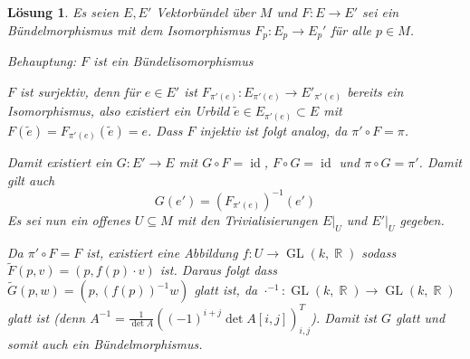 \documentclass[paper=A4, twoside, chapterprefix=true, bibliography=totoc, headsepline]{scrbook}
\DeclareMathOperator{\R}{\mathbb{R}}
\DeclareMathOperator{\GL}{GL}       %
\DeclareMathOperator{\Id}{id}       %
\newcommand{\X}{\times}
\theoremstyle{plain}
\theoremstyle{nonumberplain}
\theoremstyle{empty}
\theoremstyle{break}
\newtheorem{Loes}{L\"osung}
\begin{document}
\begin{Loes}
Es seien $E, E'$ Vektorb\"undel \"uber $M$ und $F: E \to E'$ sei ein B\"undelmorphismus mit dem Isomorphismus $F_p: E_p \to E_p'$ f\"ur alle $p \in M$.

\emph{Behauptung:} $F$ ist ein B\"undelisomorphismus

$F$ ist surjektiv, denn f\"ur $e \in E'$ ist $F_{\pi'(e)}: E_{\pi'(e)} \to E'_{\pi'(e)}$ bereits ein Isomorphismus, also existiert ein Urbild $\tilde e \in E_{\pi'(e)} \subset E$ mit $F(\tilde e) = F_{\pi'(e)}(\tilde e) = e$. Dass $F$ injektiv ist folgt analog, da $\pi' \circ F = \pi$.

Damit existiert ein $G: E' \to E$ mit $G \circ F = \Id$, $F \circ G = \Id$ und $\pi \circ G = \pi'$. Damit gilt auch
	\[ G(e') = (F_{\pi'(e)})^{-1}(e') \]
Es sei nun ein offenes $U  \subseteq M$ mit den Trivialisierungen $E|_U$ und $E'|_U$ gegeben.
\begin{center}\end{center}
Da $\pi' \circ F = F$ ist, existiert eine Abbildung $f: U \to \GL(k, \R)$ sodass $\tilde F(p,v) = (p, f(p) \cdot v)$ ist. Daraus folgt dass $\tilde G(p,w) = (p, (f(p))^{-1}w)$ glatt ist, da $\cdot^{-1}: \GL(k,\R) \to \GL(k, \R)$ glatt ist (denn $A^{-1} = \frac{1}{\det A}((-1)^{i+j} \det A[i,j])_{i,j}^T$). Damit ist $G$ glatt und somit auch ein B\"undelmorphismus.
\end{Loes}
\end{document}
